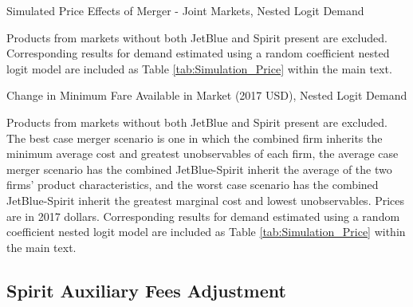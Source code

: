 \documentclass{article}
\begin{document}
\begin{appendices}
      \begin{table}
        \caption{Simulated Price Effects of Merger - Joint Markets, Nested Logit Demand}
        \label{tab:Simulation_Price_NestedLogit}
                \vspace{-15mm}
        \begin{center}
         
        \end{center}
        \vspace{-5mm}
        \footnotesize{Products from markets without both JetBlue and Spirit present are excluded. Corresponding results for demand estimated using a random coefficient nested logit model are included as Table \ref{tab:Simulation_Price} within the main text.}

     \end{table}

 \begin{table}
        \caption{Change in Minimum Fare Available in Market (2017 USD), Nested Logit Demand}
        \label{tab:MinimumPrice_NestedLogit}
                \vspace{-15mm}
        \begin{center}
            
        \end{center}
        \vspace{-5mm}
        \footnotesize{Products from markets without both JetBlue and Spirit present are excluded. The best case merger scenario is one in which the combined firm inherits the minimum average cost and greatest unobservables of each firm, the average case merger scenario has the combined JetBlue-Spirit inherit the average of the two firms' product characteristics, and the worst case scenario has the combined JetBlue-Spirit inherit the greatest marginal cost and lowest unobservables. Prices are in 2017 dollars. Corresponding results for demand estimated using a random coefficient nested logit model are included as Table \ref{tab:Simulation_Price} within the main text.}
    \end{table}    
\FloatBarrier

    \subsection{Spirit Auxiliary Fees Adjustment}


\end{appendices}
\end{document}
